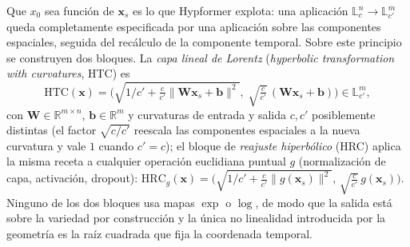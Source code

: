 Que $x_0$ sea función de $\mathbf{x}_s$ es lo que Hypformer explota: una aplicación $\mathbb{L}^n_c \to \mathbb{L}^m_{c'}$ queda completamente especificada por una aplicación sobre las componentes espaciales, seguida del recálculo de la componente temporal. Sobre este principio se construyen dos bloques. La \emph{capa lineal de Lorentz} (\emph{hyperbolic transformation with curvatures}, HTC) es
\begin{equation}
    \text{HTC}(\mathbf{x}) = \Big( \sqrt{1/c' + \tfrac{c}{c'}\|\mathbf{W}\mathbf{x}_s + \mathbf{b}\|^2}, \; \sqrt{\tfrac{c}{c'}}\,(\mathbf{W}\mathbf{x}_s + \mathbf{b}) \Big) \in \mathbb{L}^m_{c'},
    \label{eq:hypformer_htc}
\end{equation}
con $\mathbf{W} \in \mathbb{R}^{m \times n}$, $\mathbf{b} \in \mathbb{R}^m$ y curvaturas de entrada y salida $c, c'$ posiblemente distintas (el factor $\sqrt{c/c'}$ reescala las componentes espaciales a la nueva curvatura y vale $1$ cuando $c' = c$); el bloque de \emph{reajuste hiperbólico} (HRC) aplica la misma receta a cualquier operación euclidiana puntual $g$ (normalización de capa, activación, dropout): $\text{HRC}_g(\mathbf{x}) = \big(\sqrt{1/c' + \tfrac{c}{c'}\|g(\mathbf{x}_s)\|^2}, \, \sqrt{\tfrac{c}{c'}}\, g(\mathbf{x}_s)\big)$. Ninguno de los dos bloques usa mapas $\exp$ o $\log$, de modo que la salida está sobre la variedad por construcción y la única no linealidad introducida por la geometría es la raíz cuadrada que fija la coordenada temporal.

